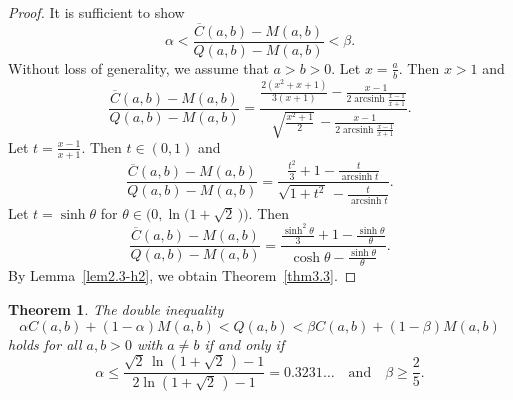 \documentclass[reqno,a4paper]{amsart}
\numberwithin{equation}{section}
\theoremstyle{plain}
\newtheorem{thm}{Theorem}[section]
\theoremstyle{remark}
\begin{document}
\begin{proof}
It is sufficient to show
\begin{equation*}
\alpha<\frac{\overline{C}(a,b)-M(a,b)}{Q(a,b)-M(a,b)}<\beta.
\end{equation*}
Without loss of generality, we assume that $a>b>0$. Let $x=\frac{a}b$. Then $x>1$ and
\begin{equation*}
\frac{\overline{C}(a,b)-M(a,b)}{Q(a,b)-M(a,b)}
=\frac{\frac{2(x^2+x+1)}{3(x+1)}-\frac{x-1}{2\operatorname{arcsinh}{\frac{x-1}{x+1}}}
}{\sqrt{\frac{x^2+1}2}\,-\frac{x-1}{2\operatorname{arcsinh}{\frac{x-1}{x+1}}}}.
\end{equation*}
Let $t=\frac{x-1}{x+1}$. Then $t\in(0,1)$ and
\begin{equation*}
\frac{\overline{C}(a,b)-M(a,b)}{Q(a,b)-M(a,b)}
=\frac{\frac{t^2}3+1-\frac{t}{\operatorname{arcsinh}{t}}}{\sqrt{1+t^2}\,-\frac{t}{\operatorname{arcsinh}{t}}}.
\end{equation*}
Let $t=\sinh\theta $ for $\theta\in\bigl(0,\ln\bigl(1+\sqrt2\,\bigr)\bigr)$. Then
\begin{equation*}
\frac{\overline{C}(a,b)-M(a,b)}{Q(a,b)-M(a,b)}
=\frac{\frac{\sinh^2\theta}3+1-\frac{\sinh\theta}\theta}{\cosh\theta-\frac{\sinh\theta}\theta}.
\end{equation*}
By Lemma~\ref{lem2.3-h2}, we obtain Theorem~\ref{thm3.3}.
\end{proof}

\begin{thm}\label{thm3.4}
The double inequality
\begin{equation}\label{thm3.4-eq1}
\alpha C(a,b)+(1-\alpha)M(a,b)<Q(a,b)<\beta C(a,b)+(1-\beta)M(a,b)
\end{equation}
holds for all $a,b>0$ with $a\ne b$ if and only if
\begin{equation*}
\alpha\le\frac{\sqrt2\,\ln(1+\sqrt2\,)-1}{2\ln(1+\sqrt2\,)-1}=0.3231\dotsc
\quad \text{and}\quad \beta\ge\frac25.
\end{equation*}
\end{thm}
\end{document}
